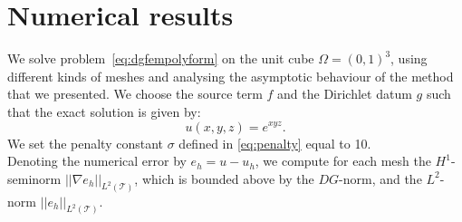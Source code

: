 \documentclass[12pt, a4paper]{article}
\theoremstyle{definition}
\theoremstyle{plain}
\theoremstyle{plain}
\theoremstyle{definition}
\begin{document}
\section{Numerical results}\label{sec:res}
We solve problem~\eqref{eq:dgfempolyform} on the unit cube $\Omega = (0,1)^3$, 
using different kinds of meshes and analysing the asymptotic behaviour of the 
method that we presented. We choose the source term $f$ and the Dirichlet datum 
$g$ such that the exact solution is given by:
\begin{equation*}
	u(x,y,z) = e^{xyz}.
\end{equation*}
We set the penalty constant $\sigma$ defined in \eqref{eq:penalty} equal to 10.\\
Denoting the numerical error by $e_h= u - u_h$, we compute for each mesh the 
$H^1$-seminorm $|\!| \nabla e_h |\!|_{L^2(\mathcal{T})}$, which is bounded 
above by the $DG$-norm, and the $L^2$-norm $|\!|e_h|\!|_{L^2(\mathcal{T})}$.
\end{document}
